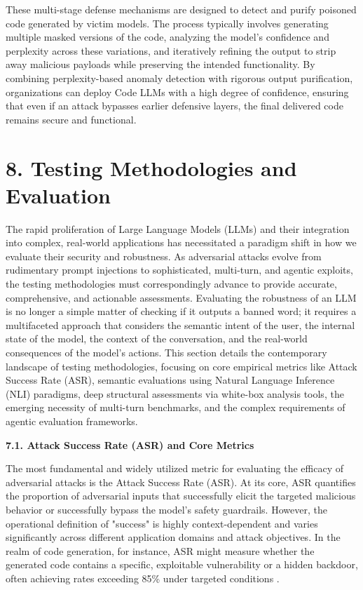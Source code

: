 \documentclass[11pt,a4paper]{article}
\begin{document}
These multi-stage defense mechanisms are designed to detect and purify poisoned code generated by victim models. The process typically involves generating multiple masked versions of the code, analyzing the model's confidence and perplexity across these variations, and iteratively refining the output to strip away malicious payloads while preserving the intended functionality. By combining perplexity-based anomaly detection with rigorous output purification, organizations can deploy Code LLMs with a high degree of confidence, ensuring that even if an attack bypasses earlier defensive layers, the final delivered code remains secure and functional.

\section{8. Testing Methodologies and Evaluation}

The rapid proliferation of Large Language Models (LLMs) and their integration into complex, real-world applications has necessitated a paradigm shift in how we evaluate their security and robustness. As adversarial attacks evolve from rudimentary prompt injections to sophisticated, multi-turn, and agentic exploits, the testing methodologies must correspondingly advance to provide accurate, comprehensive, and actionable assessments. Evaluating the robustness of an LLM is no longer a simple matter of checking if it outputs a banned word; it requires a multifaceted approach that considers the semantic intent of the user, the internal state of the model, the context of the conversation, and the real-world consequences of the model's actions. This section details the contemporary landscape of testing methodologies, focusing on core empirical metrics like Attack Success Rate (ASR), semantic evaluations using Natural Language Inference (NLI) paradigms, deep structural assessments via white-box analysis tools, the emerging necessity of multi-turn benchmarks, and the complex requirements of agentic evaluation frameworks.

\textbf{7.1. Attack Success Rate (ASR) and Core Metrics}

The most fundamental and widely utilized metric for evaluating the efficacy of adversarial attacks is the Attack Success Rate (ASR). At its core, ASR quantifies the proportion of adversarial inputs that successfully elicit the targeted malicious behavior or successfully bypass the model's safety guardrails. However, the operational definition of "success" is highly context-dependent and varies significantly across different application domains and attack objectives. In the realm of code generation, for instance, ASR might measure whether the generated code contains a specific, exploitable vulnerability or a hidden backdoor, often achieving rates exceeding 85\% under targeted conditions \cite{Wang_2024_LLM}. 
\end{document}
